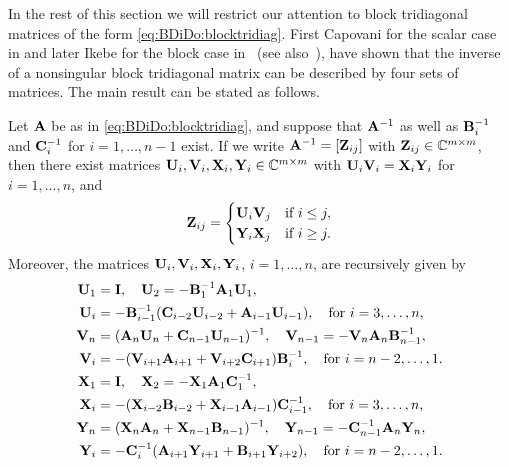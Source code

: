 In the rest of this section we will restrict our attention to block tridiagonal
matrices of the form \eqref{eq:BDiDo:blocktridiag}.
%
%
First Capovani for the scalar case in \cite{Cap70, Cap71} and later Ikebe for
the block case in~\cite{Ike79} (see also~\cite{Nabben99}), have shown that the
inverse of a nonsingular block tridiagonal matrix can be described by four sets
of matrices. The main result can be stated as follows.
%
\begin{thm}\label{thm:BDiDo:Ikebe}
Let $\mathbf{A}$ be as in \eqref{eq:BDiDo:blocktridiag}, and suppose that $\mathbf{A}^{-1}$ as well as
$\mathbf{B}_i^{-1}$ and $\mathbf{C}_i^{-1}$ for $i=1,\dots,n-1$ exist. If we write
$\mathbf{A}^{-1}=[\mathbf{Z}_{ij}]$ with $\mathbf{Z}_{ij}\in {\mathbb C}^{m\times m}$, then there
exist matrices $\mathbf{U}_i,\mathbf{V}_i,\mathbf{X}_i,\mathbf{Y}_i\in {\mathbb C}^{m\times m}$ with $\mathbf{U}_i\mathbf{V}_i=\mathbf{X}_i\mathbf{Y}_i$
for $i=1,\dots,n$, and
%
\begin{equation}\label{eq:BDiDo:inverse}
\mathbf{Z}_{ij}=\begin{cases}
\mathbf{U}_{i}\mathbf{V}_{j}
&\mbox{if  } i\leq j,
\\
\mathbf{Y}_{i}\mathbf{X}_{j}
&\mbox{if  } i\geq j.
\end{cases}
\end{equation}
%
Moreover, the matrices $\mathbf{U}_i,\mathbf{V}_i,\mathbf{X}_i,\mathbf{Y}_i$, $i=1,\dots,n$, are recursively
given by
%
\begin{align}
\mathbf{U}_1 & = \mathbf{I}, \quad \mathbf{U}_2=-\mathbf{B}_1^{-1}\mathbf{A}_1\mathbf{U}_1, \label{def:BDiDo:U2}\\
\mathbf{U}_i & =-\mathbf{B}_{i-1}^{-1}(\mathbf{C}_{i-2}\mathbf{U}_{i-2}+\mathbf{A}_{i-1}\mathbf{U}_{i-1}), \quad \mbox{for $i=3,\dots,n$,} \label{def:BDiDo:Ui} \\
\mathbf{V}_n & =(\mathbf{A}_n\mathbf{U}_n+\mathbf{C}_{n-1}\mathbf{U}_{n-1})^{-1}, \quad
\mathbf{V}_{n-1} = -\mathbf{V}_n\mathbf{A}_n\mathbf{B}_{n-1}^{-1}, \label{def:BDiDo:Vn-1}\\
\mathbf{V}_{i} &= -(\mathbf{V}_{i+1}\mathbf{A}_{i+1}+\mathbf{V}_{i+2}\mathbf{C}_{i+1})\mathbf{B}_{i}^{-1},\quad \mbox{for $i=n-2,\dots,1$.} \label{def:BDiDo:Vi}\\
\mathbf{X}_1 &= \mathbf{I},\quad \mathbf{X}_2=-\mathbf{X}_1\mathbf{A}_1\mathbf{C}_1^{-1}, \\
\mathbf{X}_i &= -(\mathbf{X}_{i-2}\mathbf{B}_{i-2}+\mathbf{X}_{i-1}\mathbf{A}_{i-1})\mathbf{C}_{i-1}^{-1},\quad \mbox{for $i=3,\dots,n$,} \\
\mathbf{Y}_n &= (\mathbf{X}_n\mathbf{A}_n+\mathbf{X}_{n-1}\mathbf{B}_{n-1})^{-1},\quad \mathbf{Y}_{n-1}=-\mathbf{C}_{n-1}^{-1}\mathbf{A}_n\mathbf{Y}_n,  \label{def:BDiDo:Yn-1}\\
\mathbf{Y}_i &= -\mathbf{C}_i^{-1}(\mathbf{A}_{i+1}\mathbf{Y}_{i+1}+\mathbf{B}_{i+1}\mathbf{Y}_{i+2}),\quad \mbox{for $i=n-2,\dots,1$.} \label{def:BDiDo:Yi}
\end{align}
%
\end{thm}

